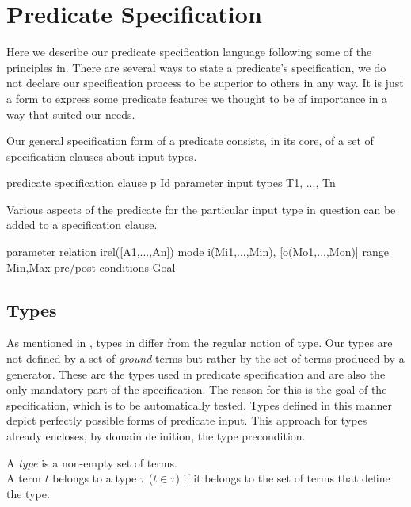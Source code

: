 
\section{Predicate Specification}
\label{sec:pred-spec}

Here we describe our predicate specification language following some of
the principles in.
%
There are several ways to state a predicate's specification, we do not
declare our specification process to be superior to others in any way.
%
It is just a form to express some predicate features we thought to be of
importance in a way that suited our needs.


Our general specification form of a predicate  consists, in its
core, of a set of specification clauses about input types.
%
\begin{code}
predicate specification clause
  p Id
parameter input types
  T1, ..., Tn
\end{code}
%
Various aspects of the predicate for the particular input type in
question can be added to a specification clause.
%
\begin{code}
parameter relation
  irel([A1,...,An])
mode
  i(Mi1,...,Min), [o(Mo1,...,Mon)]
range
  {Min,Max}
pre/post conditions
  Goal
\end{code}


\subsection{Types}

As mentioned in , types in \plqc{} differ from
the regular notion of type.
%
Our types are not defined by a set of \emph{ground} terms but rather by
the set of terms produced by a generator.
%
These are the types used in predicate specification and are also
the only mandatory part of the specification.
%
The reason for this is the goal of the specification, which is to be
automatically tested.
%
Types defined in this manner depict perfectly possible forms of
predicate input.
%
This approach for types already encloses, by domain definition, the type
precondition.


\begin{definition}
\label{def:type}
A {\em type} is a non-empty set of terms.\\
A term $t$ belongs to a type $\tau$ ($t \in \tau$) if it belongs to the set of
terms that define the type.
\end{definition}


